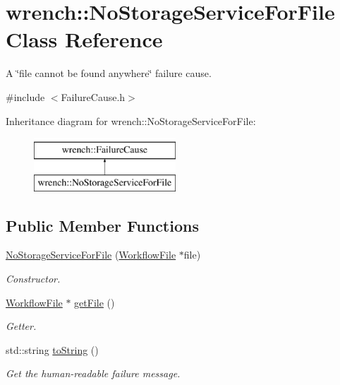 \hypertarget{classwrench_1_1_no_storage_service_for_file}{}\section{wrench\+:\+:No\+Storage\+Service\+For\+File Class Reference}
\label{classwrench_1_1_no_storage_service_for_file}


A \char`\"{}file cannot be found anywhere\char`\"{} failure cause.  




{\ttfamily \#include $<$Failure\+Cause.\+h$>$}

Inheritance diagram for wrench\+:\+:No\+Storage\+Service\+For\+File\+:\begin{figure}[H]
\begin{center}
\leavevmode
\includegraphics[height=2.000000cm]{classwrench_1_1_no_storage_service_for_file}
\end{center}
\end{figure}
\subsection*{Public Member Functions}
\begin{DoxyCompactItemize}
\item 
\hyperlink{classwrench_1_1_no_storage_service_for_file_a0f82dcea16ae2d5bd47186002906e840}{No\+Storage\+Service\+For\+File} (\hyperlink{classwrench_1_1_workflow_file}{Workflow\+File} $\ast$file)
\begin{DoxyCompactList}\small\item\em Constructor. \end{DoxyCompactList}\item 
\hyperlink{classwrench_1_1_workflow_file}{Workflow\+File} $\ast$ \hyperlink{classwrench_1_1_no_storage_service_for_file_a0f9c9e16bac0150881b4303385b716a0}{get\+File} ()
\begin{DoxyCompactList}\small\item\em Getter. \end{DoxyCompactList}\item 
std\+::string \hyperlink{classwrench_1_1_no_storage_service_for_file_ab3941ca284f35abd00e9292e22d7d553}{to\+String} ()
\begin{DoxyCompactList}\small\item\em Get the human-\/readable failure message. \end{DoxyCompactList}\end{DoxyCompactItemize}
